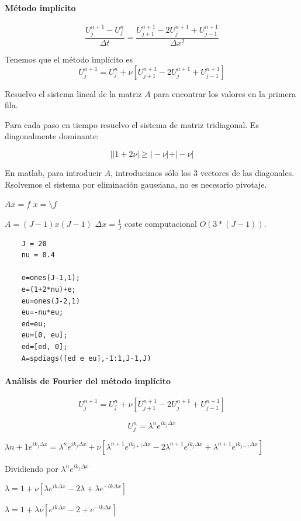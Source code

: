 \paragraph{Método implícito}
$$\frac{U_j^{n+1}-U_j^n}{\Delta t} = \frac{U_{j+1}^{n+1}-2U_{j}^{n+1}+U_{j-1}^{n+1}}{\Delta x^2}$$

Tenemos que el método implícito es
$$U_j^{n+1} = U_j^n + \nu \left[U_{j+1}^{n+1}-2U_{j}^{n+1}+U_{j-1}^{n+1}\right]$$



Resuelvo el sistema lineal de la matriz $A$ para encontrar los valores en la primera fila.

Para cada paso en tiempo resuelvo el sistema de matriz tridiagonal. Es diagonalmente dominante:

$$||1+2\nu|\ge |-\nu|+|-\nu|$$

En matlab, para introducir $A$, introducimos sólo los 3 vectores de las diagonales. Rsolvemos el sistema por eliminación gaussiana, no es necesario pivotaje.

$Ax =f$
$x=\setminus f$

$A=(J-1)x(J-1)$
$\Delta x = \frac{1}{J}$
coste computacional $O(3*(J-1))$.

\begin{lstlisting}
	J = 20
	nu = 0.4
	
	e=ones(J-1,1);
	e=(1+2*nu)+e;
	eu=ones(J-2,1)
	eu=-nu*eu;
	ed=eu;
	eu=[0, eu];
	ed=[ed, 0];
	A=spdiags([ed e eu],-1:1,J-1,J)
\end{lstlisting}

\paragraph*{Análisis de Fourier del método implícito}

$$U_j^{n+1} = U_j^n + \nu \left[U_{j+1}^{n+1} - 2U_j^{n+1}+U_{j-1}^{n+1}\right]$$

$$U_j^n = \lambda^n e^{ik_j\Delta x}$$

$\lambda{n+1} e^{ik_j\Delta x} = \lambda^n e^{ik_j\Delta x} + \nu \left[\lambda^{n+1}e^{ik_{j+1}\Delta x} - 2\lambda^{n+1}e^{ik_j\Delta x}+\lambda^{n+1}e^{ik_{j-1}\Delta x}\right]$

Dividiendo por $\lambda^n e^{ik_j\Delta x}$

$\lambda = 1+\nu\left[\lambda e^{ik\Delta x}-2\lambda + \lambda e^{-ik\Delta x}\right]$

$\lambda =  1+\lambda \nu\left[e^{ik\Delta x} - 2 + e^{-ik\Delta x}\right]$

